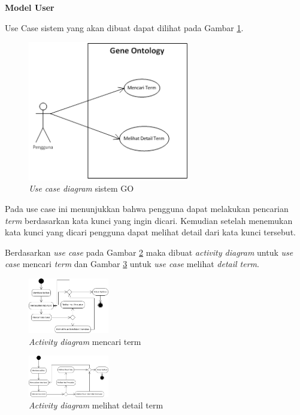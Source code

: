 \begin{flushleft}
\textbf{Model User}
\end{flushleft}
Use Case sistem yang akan dibuat dapat dilihat pada Gambar \ref{fig:use_case}.
\begin{figure}[h!] %
	\centering
	\includegraphics[width=200pt]{use_case.png}
	\caption{\textit{Use case diagram} sistem GO}
	\label{fig:use_case}
\end{figure}
\par
Pada use case ini menunjukkan bahwa pengguna dapat melakukan pencarian \textit{term} berdasarkan kata kunci yang ingin dicari. Kemudian setelah menemukan kata kunci yang dicari pengguna dapat melihat detail dari kata kunci tersebut.

Berdasarkan \textit{use case} pada Gambar \ref{fig:act1} maka dibuat \textit{activity diagram} untuk \textit{use case} mencari \textit{term} dan Gambar \ref{fig:act2} untuk \textit{use case} melihat \textit{detail term}. 

\begin{figure}[h!] %
	\centering
	\includegraphics[width=100pt]{act1.png}
	\caption{\textit{Activity diagram} mencari term}
	\label{fig:act1}
\end{figure}

\begin{figure}[h!] %
	\centering
	\includegraphics[width=100pt]{act2.png}
	\caption{\textit{Activity diagram} melihat detail term}
	\label{fig:act2}
\end{figure}

